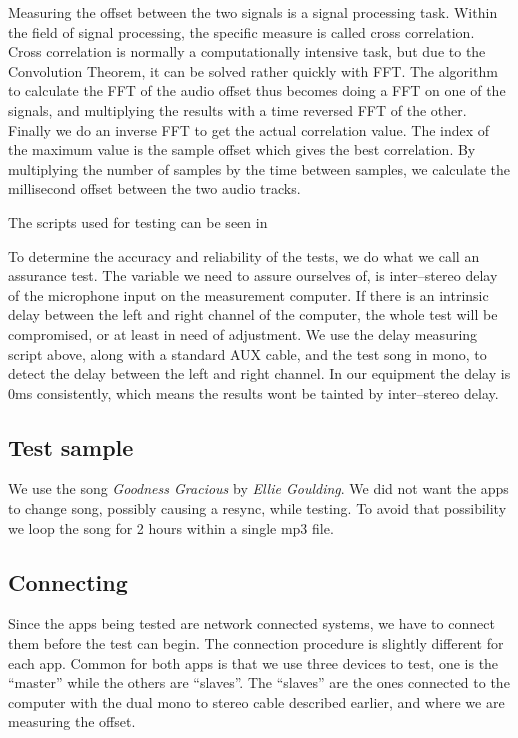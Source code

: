 Measuring the offset between the two signals is a signal processing
task. Within the field of signal processing, the specific measure is
called cross correlation. Cross correlation is normally
a computationally intensive task, but due to the Convolution
Theorem\cite{conv_theo}, it can be solved rather quickly with \ac{FFT}.
The algorithm to calculate the \ac{FFT} of the audio offset thus becomes
doing a \ac{FFT} on one of the signals, and multiplying the results with
a time reversed \ac{FFT} of the other. Finally we do an inverse \ac{FFT}
to get the actual correlation value. The index of the maximum value is
the sample offset which gives the best correlation. By multiplying the
number of samples by the time between samples, we calculate the
millisecond offset between the two audio tracks.

The scripts used for testing can be seen in 

To determine the accuracy and reliability of the tests, we do what we
call an assurance test. The variable we need to assure
ourselves of, is inter--stereo delay of the microphone input on the
measurement computer. If there is an intrinsic delay between the left and
right channel of the computer, the whole test will be
compromised, or at least in need of adjustment. We use the delay
measuring script above, along with a standard AUX cable,
and the test song in mono, to detect the delay
between the left and right channel. In our equipment the delay is 0ms
consistently, which means the results wont be tainted by inter--stereo
delay.

\subsection{Test sample}
We use the song \textit{Goodness Gracious} by \textit{Ellie Goulding}.  We did not
want the apps to change song, possibly causing a resync, while testing.
To avoid that possibility we loop the song for 2 hours within
a single mp3 file.

\subsection{Connecting}
Since the apps being tested are network connected systems, we have to
connect them before the test can begin. The connection procedure is
slightly different for each app. Common for both apps is that we use
three devices to test, one is the ``master'' while the others are
``slaves''. The ``slaves'' are the ones connected to the computer
with the dual mono to stereo cable described earlier, and where we are
measuring the offset.

